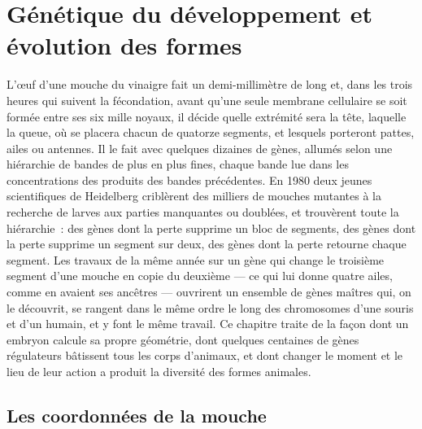 \chapter{Génétique du développement et évolution des formes}\label{ch:b3:developmental-genetics}

L'œuf d'une mouche du vinaigre fait un demi-millimètre de long et, dans
les trois heures qui suivent la fécondation, avant qu'une seule membrane
cellulaire se soit formée entre ses six mille noyaux, il décide quelle
extrémité sera la tête, laquelle la queue, où se placera chacun de
quatorze segments, et lesquels porteront pattes, ailes ou antennes. Il
le fait avec quelques dizaines de gènes, allumés selon une hiérarchie de
bandes de plus en plus fines, chaque bande lue dans les concentrations
des produits des bandes précédentes. En 1980 deux jeunes scientifiques
de Heidelberg criblèrent des milliers de mouches mutantes à la recherche
de larves aux parties manquantes ou doublées, et trouvèrent toute la
hiérarchie~: des gènes dont la perte supprime un bloc de segments, des
gènes dont la perte supprime un segment sur deux, des gènes dont la
perte retourne chaque segment. Les travaux de la même année sur un gène
qui change le troisième segment d'une mouche en copie du deuxième --- ce
qui lui donne quatre ailes, comme en avaient ses ancêtres --- ouvrirent
un ensemble de gènes maîtres qui, on le découvrit, se rangent dans le
même ordre le long des chromosomes d'une souris et d'un humain, et y
font le même travail. Ce chapitre traite de la façon dont un embryon
calcule sa propre géométrie, dont quelques centaines de gènes régulateurs
bâtissent tous les corps d'animaux, et dont changer le moment et le lieu
de leur action a produit la diversité des formes animales.

\section{Les coordonnées de la mouche}

